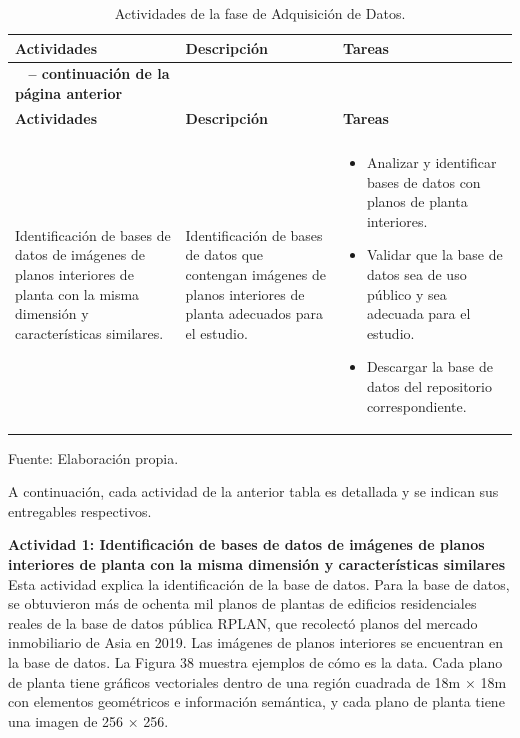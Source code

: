 \begin{longtable}{>{\raggedright\arraybackslash}p{4cm} >{\raggedright\arraybackslash}p{4cm} >{\raggedright\arraybackslash}p{5cm}}
    \caption{Actividades de la fase de Adquisición de Datos.}
    \label{tabla:actividades}\\
    \hline
    \textbf{Actividades} & \textbf{Descripción} & \textbf{Tareas}\\
    \hline
    \endfirsthead

    \multicolumn{3}{c}%
    {{\bfseries \tablename\ \thetable{} -- continuación de la página anterior}} \\
    \hline
    \textbf{Actividades} & \textbf{Descripción} & \textbf{Tareas}\\
    \hline
    \endhead

    \hline
    \multicolumn{3}{r}{{Continúa en la siguiente página}} \\
    \endfoot

    \hline
    \endlastfoot

    Identificación de bases de datos de imágenes de planos interiores de planta con la misma dimensión y características similares. & Identificación de bases de datos que contengan imágenes de planos interiores de planta adecuados para el estudio. & 
    \begin{itemize}
        \item Analizar y identificar bases de datos con planos de planta interiores.
        \item Validar que la base de datos sea de uso público y sea adecuada para el estudio.
        \item Descargar la base de datos del repositorio correspondiente.
    \end{itemize} \\
\end{longtable}


\begin{flushleft}
    \small Fuente: Elaboración propia.
\end{flushleft}

A continuación, cada actividad de la anterior tabla es detallada y se indican sus entregables respectivos.


\textbf{Actividad 1: Identificación de bases de datos de imágenes de planos interiores de planta con la misma dimensión y características similares}
\\
Esta actividad explica la identificación de la base de datos. Para la base de datos, se obtuvieron más de ochenta mil planos de plantas de edificios residenciales reales de la base de datos pública RPLAN, que recolectó planos del mercado inmobiliario de Asia en 2019. Las imágenes de planos interiores se encuentran en la base de datos. La Figura 38 muestra ejemplos de cómo es la data. Cada plano de planta tiene gráficos vectoriales dentro de una región cuadrada de 18m × 18m con elementos geométricos e información semántica, y cada plano de planta tiene una imagen de 256 × 256.


